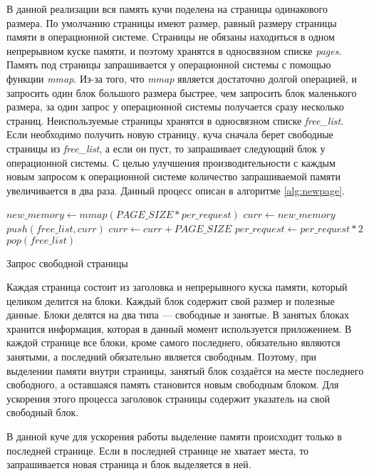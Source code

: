 \documentclass[14pt]{matmex-diploma}
\begin{document}
В данной реализации вся память кучи поделена на страницы одинакового размера. По умолчанию страницы имеют размер, равный размеру страницы памяти в операционной системе. Страницы не обязаны находиться в одном непрерывном куске памяти, и поэтому хранятся в односвязном списке \textit{pages}. Память под страницы запрашивается у операционной системы с помощью функции \textit{mmap}. Из-за того, что \textit{mmap} является достаточно долгой операцией, и запросить один блок большого размера быстрее, чем запросить блок маленького размера, за один запрос у операционной системы получается сразу несколько страниц. Неиспользуемые страницы хранятся в односвязном списке \textit{free\_list}. Если необходимо получить новую страницу, куча сначала берет свободные страницы из \textit{free\_list}, а если он пуст, то запрашивает следующий блок у операционной системы. С целью улучшения производительности с каждым новым запросом к операционной системе количество запрашиваемой памяти увеличивается в два раза. Данный процесс описан в алгоритме \ref{alg:newpage}.

\begin{algorithm}[h]
\begin{algorithmic}[1]
    \State $new\_memory \gets mmap(PAGE\_SIZE * per\_request)$
    \State $curr \gets new\_memory$
        \State $push(free\_list, curr)$
        \State $curr \gets curr + PAGE\_SIZE$ 
    \EndWhile
    \State $per\_request \gets per\_request * 2$
\EndIf
\State \Return $pop(free\_list)$ 
\end{algorithmic}
\caption{Запрос свободной страницы}\label{alg:newpage}
\end{algorithm}

Каждая страница состоит из заголовка и непрерывного куска памяти, который целиком делится на блоки. Каждый блок содержит свой размер и полезные данные.
Блоки делятся на два типа --- свободные и занятые. В занятых блоках хранится информация, которая в данный момент используется приложением. В каждой странице все блоки, кроме самого последнего, обязательно являются занятыми, а последний обязательно является свободным. Поэтому, при выделении памяти внутри страницы, занятый блок создаётся на месте последнего свободного, а оставшаяся память становится новым свободным блоком. Для ускорения этого процесса заголовок страницы содержит указатель на свой свободный блок.

В данной куче для ускорения работы выделение памяти происходит только в последней странице. Если в последней странице не хватает места, то запрашивается новая страница и блок выделяется в ней. 
\end{document}
